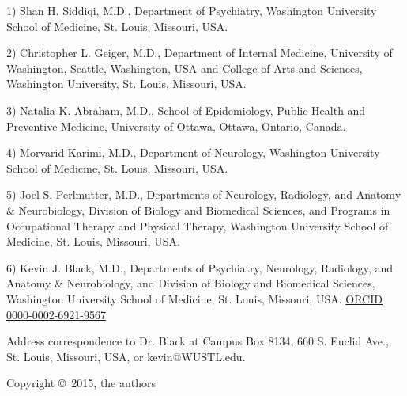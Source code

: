 1) Shan H. Siddiqi, M.D., Department of Psychiatry, Washington University School of Medicine, St. Louis, Missouri, USA.

2) Christopher L. Geiger, M.D., Department of Internal Medicine, University of Washington, Seattle, Washington, USA and College of Arts and Sciences, Washington University, St. Louis, Missouri, USA.

3) Natalia K. Abraham, M.D., School of Epidemiology, Public Health and Preventive Medicine, University of Ottawa, Ottawa, Ontario, Canada.

4) Morvarid Karimi, M.D., Department of Neurology, Washington University School of Medicine, St. Louis, Missouri, USA.

5) Joel S. Perlmutter, M.D., Departments of Neurology, Radiology, and Anatomy & Neurobiology, Division of Biology and Biomedical Sciences, and Programs in Occupational Therapy and Physical Therapy, Washington University School of Medicine, St. Louis, Missouri, USA.

6) Kevin J. Black, M.D., Departments of Psychiatry, Neurology, Radiology, and Anatomy \& Neurobiology, and Division of Biology and Biomedical Sciences, Washington University School of Medicine, St. Louis, Missouri, USA.  \href{http://orcid.org/0000-0002-6921-9567}{ORCID 0000-0002-6921-9567}

Address correspondence to Dr. Black at Campus Box 8134, 660 S. Euclid Ave., St. Louis, Missouri, USA, or kevin@WUSTL.edu.

Copyright \copyright\, 2015, the authors